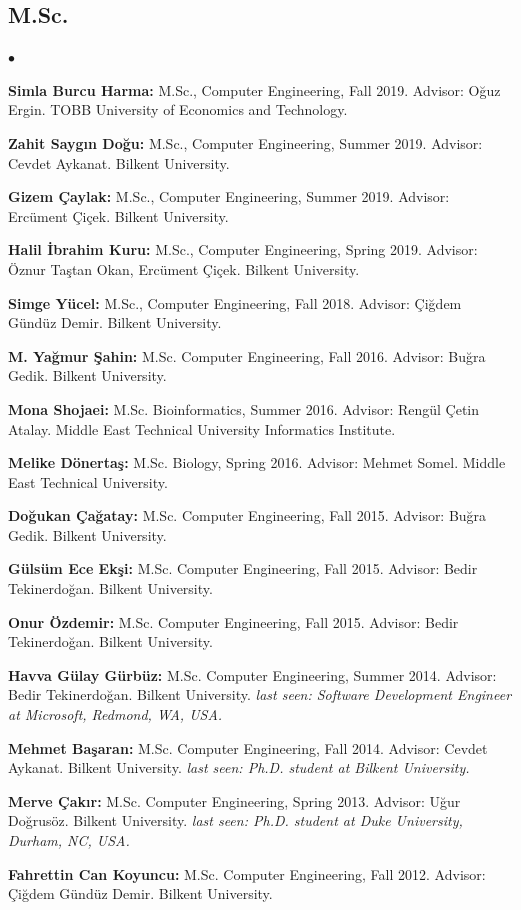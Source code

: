\documentclass[margin,line]{res}
\newenvironment{list2}{
  \begin{list}{$\bullet$}{%
      \setlength{\itemsep}{0.1cm}
      \setlength{\parsep}{0in} \setlength{\parskip}{0in}
      \setlength{\topsep}{0in} \setlength{\partopsep}{0in} 
      \setlength{\leftmargin}{0.2in}}}{\end{list}}
\begin{document}
\begin{resume}
\vspace*{-.4cm}
\subsection{\small \sc M.Sc.}
\begin{list2}
\item
{\bf  Simla Burcu Harma:} M.Sc., Computer Engineering, Fall 2019.
  Advisor: Oğuz Ergin.
  TOBB University of Economics and Technology.
\item
{\bf  Zahit Saygın Doğu:} M.Sc., Computer Engineering, Summer 2019.
  Advisor: Cevdet Aykanat.
  Bilkent University.
  \item
{\bf  Gizem Çaylak:} M.Sc., Computer Engineering, Summer 2019.
  Advisor: Ercüment Çiçek.
  Bilkent University.
\item
{\bf  Halil İbrahim Kuru:} M.Sc., Computer Engineering, Spring 2019.
  Advisor: Öznur Taştan Okan, Ercüment Çiçek.
  Bilkent University.
\item
  {\bf Simge Yücel:} M.Sc., Computer Engineering, Fall 2018.
  Advisor: Çiğdem Gündüz Demir.
  Bilkent University.
\item
  {\bf M. Yağmur Şahin:} M.Sc. Computer Engineering, Fall 2016. Advisor: Buğra Gedik.
  Bilkent University. 
\item
  {\bf Mona Shojaei:} M.Sc. Bioinformatics,  Summer 2016. Advisor: Rengül Çetin Atalay.
  Middle East Technical University Informatics Institute.
\item
  {\bf Melike Dönertaş:} M.Sc. Biology, Spring 2016. Advisor: Mehmet Somel.
  Middle East Technical University. 
\item
  {\bf Doğukan Çağatay:} M.Sc. Computer Engineering,  Fall 2015. Advisor: Buğra Gedik.
  Bilkent University. 
\item
  {\bf Gülsüm Ece Ekşi:} M.Sc. Computer Engineering,  Fall 2015. Advisor: Bedir Tekinerdoğan.
  Bilkent University. 
\item
  {\bf Onur Özdemir:} M.Sc. Computer Engineering,  Fall 2015. Advisor: Bedir Tekinerdoğan.
  Bilkent University. 
\item
  {\bf Havva Gülay Gürbüz:} M.Sc. Computer Engineering, Summer 2014. Advisor: Bedir Tekinerdoğan.
  Bilkent University. 
  {\it last seen: Software Development Engineer at Microsoft, Redmond, WA, USA.}
\item
  {\bf Mehmet Başaran:} M.Sc. Computer Engineering, Fall 2014. Advisor: Cevdet Aykanat.
  Bilkent University. {\it last seen: Ph.D. student at Bilkent University.}
\item
  {\bf Merve Çakır:} M.Sc. Computer Engineering, Spring 2013. Advisor: Uğur Doğrusöz.
  Bilkent University. {\it last seen: Ph.D. student at Duke University, Durham, NC, USA.}
\item
  {\bf Fahrettin Can Koyuncu:} M.Sc. Computer Engineering, Fall 2012. Advisor: Çiğdem Gündüz Demir.
  Bilkent University. 
  \end{list2}




\end{resume}
\end{document}
